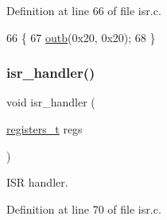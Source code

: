 Definition at line 66 of file isr.\+c.


\begin{DoxyCode}
66            \{
67     \hyperlink{a00140_aa37f5841c54156a4b14fc0d6f626b44f_aa37f5841c54156a4b14fc0d6f626b44f}{outb}(0x20, 0x20);
68 \}
\end{DoxyCode}
\mbox{\label{a00101_a700e3ca056bf69296370f504f2cb6cc8_a700e3ca056bf69296370f504f2cb6cc8}} 
\subsubsection{\texorpdfstring{isr\+\_\+handler()}{isr\_handler()}}
{\footnotesize\ttfamily void isr\+\_\+handler (\begin{DoxyParamCaption}\item[{\hyperlink{a00104_adf58dbaf6139b4957c348711f2026957_adf58dbaf6139b4957c348711f2026957}{registers\+\_\+t}}]{regs }\end{DoxyParamCaption})}



I\+SR handler. 



Definition at line 70 of file isr.\+c.


